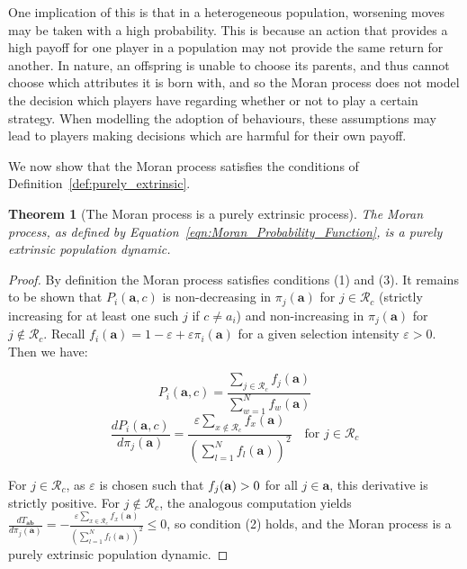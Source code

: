 \documentclass{article}
\newcommand{\gt}{\ensuremath >}
\newtheorem{theorem}{Theorem}
\begin{document}
One implication of this is that in a heterogeneous population, worsening moves
may be taken with a high probability. This is because an action that provides a
high payoff for one player in a population may not provide the same return for
another. In nature, an offspring is unable to choose its parents, and thus
cannot choose which attributes it is born with, and so the Moran process does
not model the decision which players have regarding whether or not to play a
certain strategy. When modelling the adoption of behaviours, these assumptions
may lead to players making decisions which are harmful for their own payoff.

We now show that the Moran process satisfies the conditions of
Definition~\ref{def:purely_extrinsic}.

\begin{theorem}[The Moran process is a purely extrinsic process]
    The Moran process, as defined by
    Equation~\eqref{eqn:Moran_Probability_Function}, is a purely extrinsic
    population dynamic.
    \label{the:Moran_PE}
\end{theorem}

\begin{proof}
By definition the Moran process satisfies conditions (1) and (3). It remains to
be shown that \(P_i(\mathbf{a}, c)\) is non-decreasing in
\(\pi_j(\mathbf{a})\) for \(j \in \mathcal{R}_c\) (strictly increasing for at
least one such \(j\) if \(c \neq a_i\)) and non-increasing in
\(\pi_j(\mathbf{a})\) for \(j \notin \mathcal{R}_c\). Recall \(f_i(\mathbf{a}) = 1
- \varepsilon + \varepsilon \pi_i(\mathbf{a})\) for a given selection intensity
\(\varepsilon > 0\). Then we have:

\[P_i(\mathbf{a}, c) = \frac{\sum_{j \in \mathcal{R}_c}
f_j(\mathbf{a})}{\sum_{w=1}^N f_w(\mathbf{a})}\]
\[
\frac{dP_i(\mathbf{a}, c)}{d\pi_j(\mathbf{a})} = \frac{\varepsilon \sum_{x \notin \mathcal{R}_c}
f_x(\mathbf{a})}{\left(\sum_{l=1}^N f_l(\mathbf{a})\right)^2}
\quad\text{for } j \in \mathcal{R}_c\]

For \(j \in \mathcal{R}_c\), as \(\varepsilon\) is chosen such that
\(f_j(\mathbf{a}) \gt 0\) for all \(j \in \mathbf{a}\), this derivative is
strictly positive. For \(j \notin \mathcal{R}_c\), the analogous computation
yields \(\frac{dT_{\mathbf{ab}}}{d\pi_j(\mathbf{a})} = -\frac{\varepsilon \sum_{x
\in \mathcal{R}_c} f_x(\mathbf{a})}{(\sum_{l=1}^N f_l(\mathbf{a}))^2} \leq 0\),
so condition (2) holds, and the Moran process is a purely extrinsic population dynamic. 
\end{proof}
\end{document}
